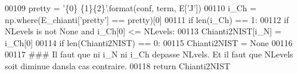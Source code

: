 \begin{DoxyCode}
00109             pretty = \textcolor{stringliteral}{'\{0\} \{1\}\{2\}'}.format(conf, term, E[\textcolor{stringliteral}{'J'}])
00110             i\_Ch = np.where(E\_chianti[\textcolor{stringliteral}{'pretty'}] == pretty)[0]
00111             \textcolor{keywordflow}{if} len(i\_Ch) == 1:
00112                 \textcolor{keywordflow}{if} NLevels \textcolor{keywordflow}{is} \textcolor{keywordflow}{not} \textcolor{keywordtype}{None} \textcolor{keywordflow}{and} i\_Ch[0] <= NLevels:
00113                     Chianti2NIST[i\_N] = i\_Ch[0]
00114     \textcolor{keywordflow}{if} len(Chianti2NIST) == 0:
00115         Chianti2NIST = \textcolor{keywordtype}{None}
00116         
00117         \textcolor{comment}{### Il faut que ni i\_N ni i\_Ch depasse NLvels. Et il faut que NLevels soit diminue dansla cas
       contraire.}
00118     \textcolor{keywordflow}{return} Chianti2NIST
        
\end{DoxyCode}
